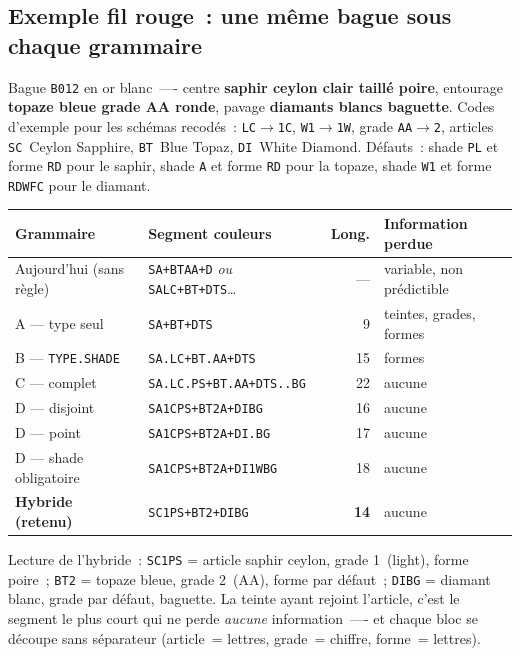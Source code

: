 \documentclass[11pt,a4paper]{article}
\newcommand{\code}[1]{\texttt{#1}}
\begin{document}
\subsection{Exemple fil rouge~: une même bague sous chaque grammaire}

Bague \code{B012} en or blanc~—- centre \textbf{saphir ceylon clair
taillé poire}, entourage \textbf{topaze bleue grade AA ronde}, pavage
\textbf{diamants blancs baguette}. Codes d'exemple pour les schémas
recodés~: \code{LC}$\to$\code{1C}, \code{W1}$\to$\code{1W}, grade
\code{AA}$\to$\code{2}, articles \code{SC}~Ceylon Sapphire,
\code{BT}~Blue Topaz, \code{DI}~White Diamond. Défauts~: shade
\code{PL} et forme \code{RD} pour le saphir, shade \code{A} et forme
\code{RD} pour la topaze, shade \code{W1} et forme \code{RDWFC} pour le
diamant.

\begin{center}
\small
\begin{tabular}{l l r l}
\toprule
Grammaire & Segment couleurs & Long. & Information perdue \\
\midrule
Aujourd'hui (sans règle) & \code{SA+BTAA+D} \emph{ou} \code{SALC+BT+DTS}\ldots & — & variable, non prédictible \\
A — type seul            & \code{SA+BT+DTS}            &  9 & teintes, grades, formes \\
B — \code{TYPE.SHADE}    & \code{SA.LC+BT.AA+DTS}      & 15 & formes \\
C — complet              & \code{SA.LC.PS+BT.AA+DTS..BG} & 22 & aucune \\
D — disjoint             & \code{SA1CPS+BT2A+DIBG}     & 16 & aucune \\
D — point                & \code{SA1CPS+BT2A+DI.BG}    & 17 & aucune \\
D — shade obligatoire    & \code{SA1CPS+BT2A+DI1WBG}   & 18 & aucune \\
\textbf{Hybride (retenu)} & \code{SC1PS+BT2+DIBG}     & \textbf{14} & aucune \\
\bottomrule
\end{tabular}
\end{center}

Lecture de l'hybride~: \code{SC1PS} = article saphir ceylon, grade
1~(light), forme poire~; \code{BT2} = topaze bleue, grade 2~(AA), forme
par défaut~; \code{DIBG} = diamant blanc, grade par défaut, baguette. La
teinte ayant rejoint l'article, c'est le segment le plus court qui ne
perde \emph{aucune} information~—- et chaque bloc se découpe sans
séparateur (article~= lettres, grade~= chiffre, forme~= lettres).
\end{document}
